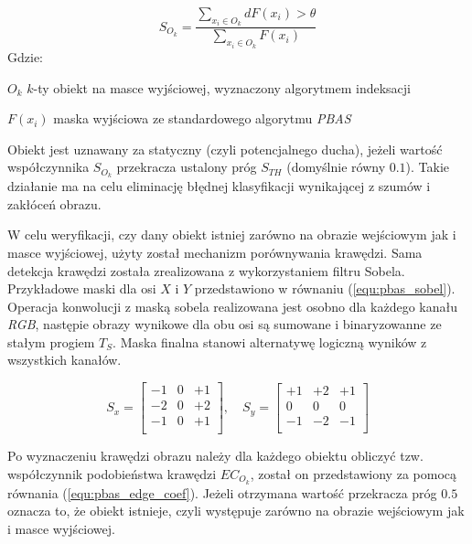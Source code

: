     \begin{equation}
        S_{O_k} = \frac{ \sum_{x_i \in O_k} dF(x_i) > \theta }{ \sum_{x_i \in O_k} F(x_i) }
    \label{equ:pbas_stability}
    \end{equation}
Gdzie:
\begin{eqwhere}[2cm]
	\item[$O_k$] $k$-ty obiekt na masce wyjściowej, wyznaczony algorytmem indeksacji
	\item[$F(x_i)$] maska wyjściowa ze standardowego algorytmu \textit{PBAS}
\end{eqwhere}

\noindent Obiekt jest uznawany za statyczny (czyli potencjalnego ducha), jeżeli wartość współczynnika $S_{O_k}$ przekracza ustalony próg $S_{TH}$ (domyślnie równy $0.1$). Takie działanie ma na celu eliminację błędnej klasyfikacji wynikającej z szumów i zakłóceń obrazu.


W celu weryfikacji, czy dany obiekt istniej zarówno na obrazie wejściowym jak i masce wyjściowej, użyty został mechanizm porównywania krawędzi. Sama detekcja krawędzi została zrealizowana z wykorzystaniem filtru Sobela. Przykładowe maski dla osi $X$ i $Y$ przedstawiono w równaniu (\ref{equ:pbas_sobel}). Operacja konwolucji z maską sobela realizowana jest osobno dla każdego kanału \textit{RGB}, następie obrazy wynikowe dla obu osi są sumowane i binaryzowanne ze stałym progiem $T_S$. Maska finalna stanowi alternatywę logiczną wyników z wszystkich kanałów.

    \begin{equation}
        S_x = \begin{bmatrix}
			    -1 & 0 & +1 \\
			    -2 & 0 & +2 \\
			    -1 & 0 & +1 \\
		    \end{bmatrix}
		,\quad 
		S_y = \begin{bmatrix}
			    +1 & +2 & +1 \\
			    0 & 0 & 0 \\
			    -1 & -2 & -1 \\
		    \end{bmatrix} 
    \label{equ:pbas_sobel}
    \end{equation}

Po wyznaczeniu krawędzi obrazu należy dla każdego obiektu obliczyć tzw. współczynnik podobieństwa krawędzi $EC_{O_k}$, został on przedstawiony za pomocą równania (\ref{equ:pbas_edge_coef}).  Jeżeli otrzymana wartość przekracza próg $0.5$ oznacza to, że obiekt istnieje, czyli występuje zarówno na obrazie wejściowym jak i masce wyjściowej. 

